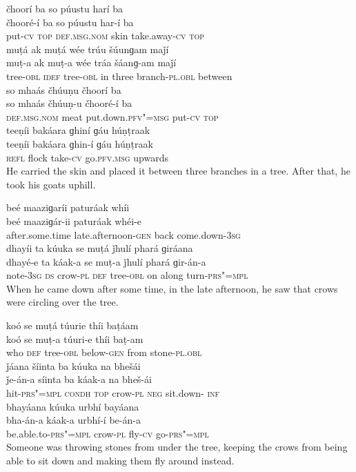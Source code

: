 \begin{exe}
\ex
\label{ex:8}
\glll čhoorí	ba	so	púustu	harí	ba \\
čhooré-í	ba	so	púustu	har-í	ba \\
put-\textsc{cv} \textsc{top} \textsc{def.msg.nom}	skin	take.away-\textsc{cv}   \textsc{top} \\
\glll muṭá	ak	muṭá	wée	trúu	šúunɡam	maǰí \\
muṭ-a	ak	muṭ-a	wée	tráa	šáanɡ-am	maǰí \\
tree-\textsc{obl} \textsc{idef}	tree-\textsc{obl}	in	three	branch-\textsc{pl.obl}	between \\
\glll so	mhaás	čhúuṇu	čhoorí	ba \\
so	mhaás	čhúuṇ-u	čhooré-í	ba \\
\textsc{def.msg.nom}	meat	put.down.\textsc{pfv"=msg}	put-\textsc{cv} \textsc{top} \\
\glll teeṇíi	bakáara	ɡhiní	ɡáu	húṇṭraak \\
teeṇíi	bakáara	ɡhin-í	ɡáu	húṇṭraak \\
\textsc{refl}	flock	take-\textsc{cv}	go.\textsc{pfv.msg}	upwards \\
\glt He carried the skin and placed it between three branches in a tree. After that, he took his goats uphill.

\ex
\label{ex:9}
\glll beé	maaziɡaríi	paturáak	whíi \\
beé	maaziɡár-ii	paturáak	whéi-e \\
after.some.time	late.afternoon-\textsc{gen}	back	come.down-\textsc{3sg} \\
\glll dhayíi	ta	kúuka	se	muṭá	ǰhulí	phará ɡiráana \\
dhayé-e	ta	káak-a	se	muṭ-a	ǰhulí	phará ɡir-án-a \\
note-\textsc{3sg}  \textsc{ds}	crow-\textsc{pl} \textsc{def}	tree-\textsc{obl}	on	along turn-\textsc{prs"=mpl} \\
\glt When he came down after some time, in the late afternoon, he saw that crows were circling over the tree.

\ex
\label{ex:10}
\glll koó	se	muṭá	túurie	thíi	baṭáam \\
koó	se	muṭ-a	túuri-e	thíi	baṭ-am \\
who	\textsc{def}	tree-\textsc{obl}	below-\textsc{gen}	from	stone-\textsc{pl.obl} \\
\glll ǰáana	šíinta	ba	kúuka	na	bhešái \\
ǰe-án-a	síinta	ba	káak-a	na	bheš-ái \\
hit-\textsc{prs"=mpl} \textsc{condh} \textsc{top}	crow-\textsc{pl} \textsc{neg}	sit.down- \textsc{inf} \\
\glll bhayáana	kúuka	urbhí	bayáana \\
bha-án-a	káak-a	urbhí-í	be-án-a \\
be.able.to-\textsc{prs"=mpl}	crow-\textsc{pl}	fly-\textsc{cv}	go-\textsc{prs"=mpl} \\
\glt Someone was throwing stones from under the tree, keeping the crows from being able to sit down and making them fly around instead.


\end{exe}
